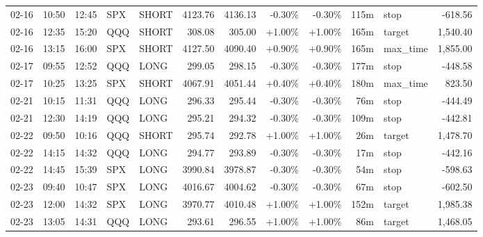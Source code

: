 \documentclass[11pt,a4paper]{article}
\begin{document}
\begin{center}
\begin{longtable}{>{\color{txtmain}}l l l l l r r r r r >{\color{txtmain}}l r}
02-16 & 10:50 & 12:45 & SPX & SHORT & 4123.76 & 4136.13 & \textcolor{lossred}{-0.30\%} & \textcolor{lossred}{-0.30\%} & 115m & stop & \textcolor{lossred}{-618.56} \\
02-16 & 12:35 & 15:20 & QQQ & SHORT & 308.08 & 305.00 & \textcolor{wingreen}{+1.00\%} & \textcolor{wingreen}{+1.00\%} & 165m & target & \textcolor{wingreen}{1,540.40} \\
02-16 & 13:15 & 16:00 & SPX & SHORT & 4127.50 & 4090.40 & \textcolor{wingreen}{+0.90\%} & \textcolor{wingreen}{+0.90\%} & 165m & max\_time & \textcolor{wingreen}{1,855.00} \\
02-17 & 09:55 & 12:52 & QQQ & LONG & 299.05 & 298.15 & \textcolor{lossred}{-0.30\%} & \textcolor{lossred}{-0.30\%} & 177m & stop & \textcolor{lossred}{-448.58} \\
02-17 & 10:25 & 13:25 & SPX & SHORT & 4067.91 & 4051.44 & \textcolor{wingreen}{+0.40\%} & \textcolor{wingreen}{+0.40\%} & 180m & max\_time & \textcolor{wingreen}{823.50} \\
02-21 & 10:15 & 11:31 & QQQ & LONG & 296.33 & 295.44 & \textcolor{lossred}{-0.30\%} & \textcolor{lossred}{-0.30\%} & 76m & stop & \textcolor{lossred}{-444.49} \\
02-21 & 12:30 & 14:19 & QQQ & LONG & 295.21 & 294.32 & \textcolor{lossred}{-0.30\%} & \textcolor{lossred}{-0.30\%} & 109m & stop & \textcolor{lossred}{-442.81} \\
02-22 & 09:50 & 10:16 & QQQ & SHORT & 295.74 & 292.78 & \textcolor{wingreen}{+1.00\%} & \textcolor{wingreen}{+1.00\%} & 26m & target & \textcolor{wingreen}{1,478.70} \\
02-22 & 14:15 & 14:32 & QQQ & LONG & 294.77 & 293.89 & \textcolor{lossred}{-0.30\%} & \textcolor{lossred}{-0.30\%} & 17m & stop & \textcolor{lossred}{-442.16} \\
02-22 & 14:45 & 15:39 & SPX & LONG & 3990.84 & 3978.87 & \textcolor{lossred}{-0.30\%} & \textcolor{lossred}{-0.30\%} & 54m & stop & \textcolor{lossred}{-598.63} \\
02-23 & 09:40 & 10:47 & SPX & LONG & 4016.67 & 4004.62 & \textcolor{lossred}{-0.30\%} & \textcolor{lossred}{-0.30\%} & 67m & stop & \textcolor{lossred}{-602.50} \\
02-23 & 12:00 & 14:32 & SPX & LONG & 3970.77 & 4010.48 & \textcolor{wingreen}{+1.00\%} & \textcolor{wingreen}{+1.00\%} & 152m & target & \textcolor{wingreen}{1,985.38} \\
02-23 & 13:05 & 14:31 & QQQ & LONG & 293.61 & 296.55 & \textcolor{wingreen}{+1.00\%} & \textcolor{wingreen}{+1.00\%} & 86m & target & \textcolor{wingreen}{1,468.05} \\

\end{longtable}
\end{center}
\end{document}
